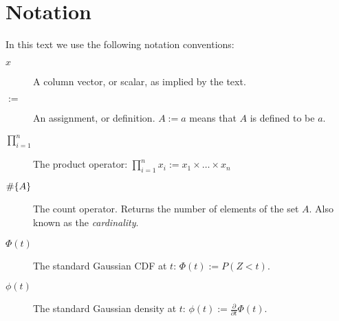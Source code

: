 


\chapter{Notation}
\label{apx:notation}

In this text we use the following notation conventions:
\begin{description}
\item[$x$] A column vector, or scalar, as implied by the text. 
\item[$:=$] An assignment, or definition. $A:=a$ means that $A$ is defined to be $a$. 
\item[$\prod_{i=1}^{n}$] The product operator: $\prod_{i=1}^{n} x_i:= x_1 \times \dots \times x_n$
\item[$\#\{ A \}$] The count operator. Returns the number of elements of the set $A$. Also known as the \emph{cardinality}.
\item[$\Phi(t)$] The standard Gaussian CDF at $t$: $\Phi(t):= P(Z<t)$.
\item[$\phi(t)$] The standard Gaussian density at $t$: $\phi(t):= \frac{\partial}{\partial t}\Phi(t)$.

\end{description}


